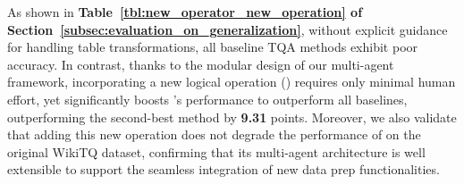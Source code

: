 As shown in \textbf{Table~\ref{tbl:new_operator_new_operation} of Section~\ref{subsec:evaluation_on_generalization}}, without explicit guidance for handling table transformations, all baseline TQA methods exhibit poor accuracy. In contrast, thanks to the modular design of our multi-agent framework, incorporating a new logical operation () requires only minimal human effort, yet significantly boosts \sys's performance to outperform all baselines, \eg outperforming the second-best method by \textbf{9.31} points. Moreover, we also validate that adding this new operation does not degrade the performance of \sys on the original WikiTQ dataset, confirming that its multi-agent architecture is well extensible to support the seamless integration of new data prep functionalities.






